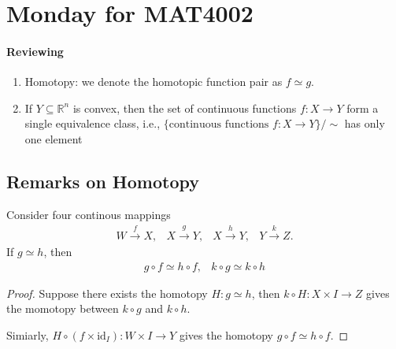 \section{Monday for MAT4002}
\paragraph{Reviewing}
\begin{enumerate}
\item
Homotopy: we denote the homotopic function pair as $f\simeq g$.
\item
If $Y\subseteq\mathbb{R}^n$ is convex, 
then the set of continuous functions $f:X\to Y$ form a single equivalence class, i.e., $\{\text{continuous functions $f:X\to Y$}\}/\sim$ has only one element
\end{enumerate}
\subsection{Remarks on Homotopy}
\begin{proposition}\label{pro:9:4}
Consider four continous mappings 
\[
\begin{array}{llll}
W\xrightarrow{f}X,
&
X\xrightarrow{g}Y,
&
X\xrightarrow{h}Y,
&
Y\xrightarrow{k} Z.
\end{array}
\]
If $g\simeq h$, then
\[
\begin{array}{ll}
g\circ f\simeq h\circ f,&
k\circ g\simeq k\circ h
\end{array}
\]
\end{proposition}
\begin{proof}
Suppose there exists the homotopy $H:g\simeq h$, 
then $k\circ H:X\times I\to Z$ 
gives the momotopy between $k\circ g$ and $k\circ h$.

Simiarly, 
$H\circ(f\times\text{id}_I):W\times I\to Y$ 
gives the homotopy $g\circ f\simeq h\circ f$.
\end{proof}


